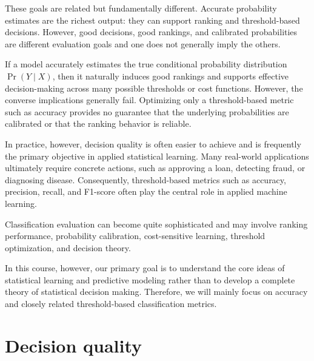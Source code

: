 \documentclass[
  letterpaper,
  DIV=11,
  numbers=noendperiod]{scrreprt}
\theoremstyle{definition}
\theoremstyle{definition}
\theoremstyle{plain}
\theoremstyle{plain}
\theoremstyle{remark}
\begin{document}
These goals are related but fundamentally different. Accurate
probability estimates are the richest output: they can support ranking
and threshold-based decisions. However, good decisions, good rankings,
and calibrated probabilities are different evaluation goals and one does
not generally imply the others.

If a model accurately estimates the true conditional probability
distribution \(\Pr(Y\mid X)\), then it naturally induces good rankings
and supports effective decision-making across many possible thresholds
or cost functions. However, the converse implications generally fail.
Optimizing only a threshold-based metric such as accuracy provides no
guarantee that the underlying probabilities are calibrated or that the
ranking behavior is reliable.

In practice, however, decision quality is often easier to achieve and is
frequently the primary objective in applied statistical learning. Many
real-world applications ultimately require concrete actions, such as
approving a loan, detecting fraud, or diagnosing disease. Consequently,
threshold-based metrics such as accuracy, precision, recall, and
F1-score often play the central role in applied machine learning.

\begin{tcolorbox}[enhanced jigsaw, arc=.35mm, bottomrule=.15mm, bottomtitle=1mm, breakable, colback=white, colbacktitle=quarto-callout-note-color!10!white, colframe=quarto-callout-note-color-frame, coltitle=black, left=2mm, leftrule=.75mm, opacityback=0, opacitybacktitle=0.6, rightrule=.15mm, title=\textcolor{quarto-callout-note-color}{\faInfo}\hspace{0.5em}{Note}, titlerule=0mm, toprule=.15mm, toptitle=1mm]

Classification evaluation can become quite sophisticated and may involve
ranking performance, probability calibration, cost-sensitive learning,
threshold optimization, and decision theory.

In this course, however, our primary goal is to understand the core
ideas of statistical learning and predictive modeling rather than to
develop a complete theory of statistical decision making. Therefore, we
will mainly focus on accuracy and closely related threshold-based
classification metrics.

\end{tcolorbox}

\section{Decision quality}\label{decision-quality}
\end{document}
